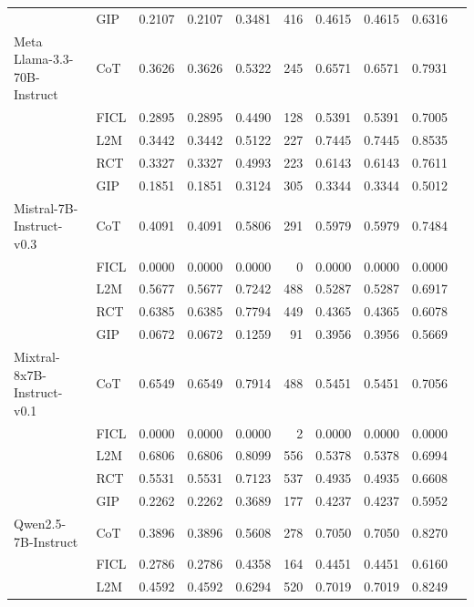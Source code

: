 \documentclass[conference]{IEEEtran}
\begin{document}
\begin{longtable}{p{3.5cm} l r r r r r r r r}
                  & GIP  & 0.2107 & 0.2107 & 0.3481 & 416 & 0.4615 & 0.4615 & 0.6316 \\ \addlinespace
Meta Llama-3.3-70B-Instruct & CoT  & 0.3626 & 0.3626 & 0.5322 & 245 & 0.6571 & 0.6571 & 0.7931 \\
                            & FICL & 0.2895 & 0.2895 & 0.4490 & 128 & 0.5391 & 0.5391 & 0.7005 \\
                            & L2M  & 0.3442 & 0.3442 & 0.5122 & 227 & 0.7445 & 0.7445 & 0.8535 \\
                            & RCT  & 0.3327 & 0.3327 & 0.4993 & 223 & 0.6143 & 0.6143 & 0.7611 \\
                            & GIP  & 0.1851 & 0.1851 & 0.3124 & 305 & 0.3344 & 0.3344 & 0.5012 \\ \addlinespace
Mistral-7B-Instruct-v0.3 & CoT  & 0.4091 & 0.4091 & 0.5806 & 291 & 0.5979 & 0.5979 & 0.7484 \\
                         & FICL & 0.0000 & 0.0000 & 0.0000 & 0 & 0.0000 & 0.0000 & 0.0000 \\
                         & L2M  & 0.5677 & 0.5677 & 0.7242 & 488 & 0.5287 & 0.5287 & 0.6917 \\
                         & RCT  & 0.6385 & 0.6385 & 0.7794 & 449 & 0.4365 & 0.4365 & 0.6078 \\
                         & GIP  & 0.0672 & 0.0672 & 0.1259 & 91 & 0.3956 & 0.3956 & 0.5669 \\ \addlinespace
Mixtral-8x7B-Instruct-v0.1 & CoT  & 0.6549 & 0.6549 & 0.7914 & 488 & 0.5451 & 0.5451 & 0.7056 \\
                           & FICL & 0.0000 & 0.0000 & 0.0000 & 2 & 0.0000 & 0.0000 & 0.0000 \\
                           & L2M  & 0.6806 & 0.6806 & 0.8099 & 556 & 0.5378 & 0.5378 & 0.6994 \\
                           & RCT  & 0.5531 & 0.5531 & 0.7123 & 537 & 0.4935 & 0.4935 & 0.6608 \\
                           & GIP  & 0.2262 & 0.2262 & 0.3689 & 177 & 0.4237 & 0.4237 & 0.5952 \\ \addlinespace
Qwen2.5-7B-Instruct & CoT  & 0.3896 & 0.3896 & 0.5608 & 278 & 0.7050 & 0.7050 & 0.8270 \\
                    & FICL & 0.2786 & 0.2786 & 0.4358 & 164 & 0.4451 & 0.4451 & 0.6160 \\
                    & L2M  & 0.4592 & 0.4592 & 0.6294 & 520 & 0.7019 & 0.7019 & 0.8249 \\

\end{longtable}
\end{document}
